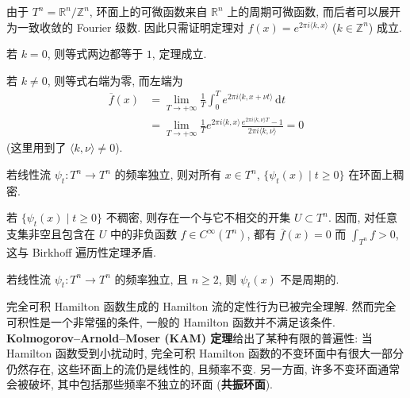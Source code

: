 \begin{RiemannProof}
由于 $T^n=\mathbb{R}^n/\mathbb{Z}^n$, 环面上的可微函数来自 $\mathbb{R}^n$ 上的周期可微函数, 而后者可以展开为一致收敛的 Fourier 级数. 因此只需证明定理对 $f(x)=e^{2\pi i\langle k,x\rangle}$ ($k\in\mathbb{Z}^n$) 成立.

若 $k=0$, 则等式两边都等于 $1$, 定理成立.

若 $k\ne0$, 则等式右端为零, 而左端为
\begin{align*}
  \overline f(x)
  &=\lim_{T\to+\infty}\frac{1}{T}\int_0^T
      e^{2\pi i\langle k,x+\nu t\rangle}\,\mathrm{d}t\\
  &=\lim_{T\to+\infty}\frac{1}{T}e^{2\pi i\langle k,x\rangle}
      \frac{e^{2\pi i\langle k,\nu\rangle T}-1}{2\pi i\langle k,\nu\rangle}=0
\end{align*}
(这里用到了 $\langle k,\nu\rangle\ne0$).
\end{RiemannProof}

\begin{RiemannCorollary}\label{cor:forward-linear-torus-orbits-dense}
若线性流 $\psi_t:T^n\to T^n$ 的频率独立, 则对所有 $x\in T^n$, $\{\psi_t(x)\mid t\geq0\}$ 在环面上稠密.
\end{RiemannCorollary}

\begin{RiemannProof}
若 $\{\psi_t(x)\mid t\geq0\}$ 不稠密, 则存在一个与它不相交的开集 $U\subset T^n$. 因而, 对任意支集非空且包含在 $U$ 中的非负函数 $f\in C^\infty(T^n)$, 都有 $\overline f(x)=0$ 而 $\int_{T^n}f>0$, 这与 Birkhoff 遍历性定理矛盾.
\end{RiemannProof}

\begin{RiemannCorollary}\label{cor:aperiodic-linear-torus-flow}
若线性流 $\psi_t:T^n\to T^n$ 的频率独立, 且 $n\geq2$, 则 $\psi_t(x)$ 不是周期的.
\end{RiemannCorollary}

\begin{RiemannRemark}\label{rem:kam-theorem-and-resonant-tori}
完全可积 Hamilton 函数生成的 Hamilton 流的定性行为已被完全理解. 然而完全可积性是一个非常强的条件, 一般的 Hamilton 函数并不满足该条件. \textbf{Kolmogorov–Arnold–Moser (KAM) 定理}给出了某种有限的普遍性: 当 Hamilton 函数受到小扰动时, 完全可积 Hamilton 函数的不变环面中有很大一部分仍然存在, 这些环面上的流仍是线性的, 且频率不变. 另一方面, 许多不变环面通常会被破坏, 其中包括那些频率不独立的环面 (\textbf{共振环面}).
\end{RiemannRemark}

